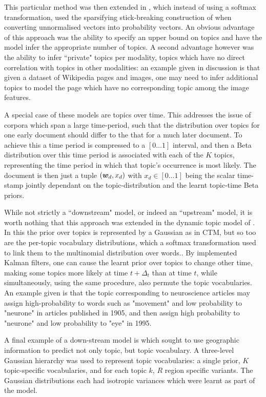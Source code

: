 This particular method was then extended in \cite{Virtanen2012a}, which instead of using a softmax transformation, used the sparsifying stick-breaking construction of \cite{Paisley2012} when converting unnormalised vectors into probability vectors. An obvious advantage of this approach was the ability to specify an upper bound on topics and have the model infer the appropriate number of topics. A second advantage however was the ability to infer ``private" topics per modality, topics which have no direct correlation with topics in other modalities: an example given in discussion is that given  a dataset of Wikipedia pages and images, one may need to infer additional topics to model the page which have no corresponding topic among the image features.

A special case of these models are topics over time\cite{Wang2006}. This addresses the issue of corpora which span a large time-period, such that the distribution over topics for one early document should differ to the that for a much later document. To achieve this a time period is compressed to a $[0\ldots 1]$ interval, and then a Beta distribution over this time period is associated with each of the $K$ topics, representing the time period in which that topic's occurrence is most likely. The document is then just a tuple $(\bm w_d, x_d)$ with $x_d \in [0\ldots 1]$ being the scalar time-stamp jointly dependant on the topic-distribution and the learnt topic-time Beta priors.

While not strictly a ``downstream" model, or indeed an ``upstream" model, it is worth nothing that this approach was extended in the dynamic topic model of \cite{Blei2006a}. In this the prior over topics is represented by a Gaussian as in CTM, but so too are the per-topic vocabulary distributions, which a softmax transformation used to link them to the multinomial distribution over words.. By implemented Kalman filters, one can cause the learnt prior over topics to change other time, making some topics more likely at time $t + \Delta_t$ than at time $t$, while simultaneously, using the same procedure, also permute the topic vocabularies. An example given is that the topic corresponding to neuroscience articles may assign high-probability to words such as "movement" and low probability to "neurone" in articles published in 1905, and then assign high probability to "neurone" and low probability to "eye" in 1995.

A final example of a down-stream model is\cite{Eisenstein2010} which sought to use geographic information to predict not only topic, but topic vocabulary. A three-level Gaussian hierarchy was used to represent topic vocabularies: a single prior, $K$ topic-specific vocabularies, and for each topic $k$, $R$ region specific variants. The Gaussian distributions each had isotropic variances which were learnt as part of the model. 

